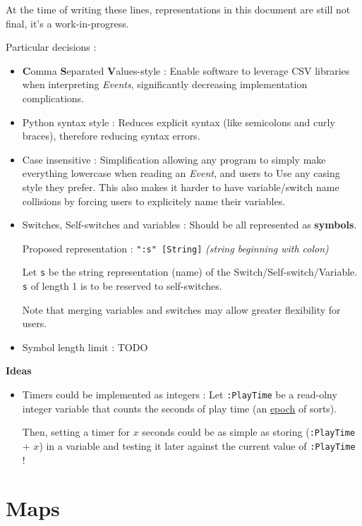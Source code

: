 \documentclass[11pt]{article}
\begin{document}
At the time of writing these lines, representations in this document are still not final, it's a work-in-progress.

Particular decisions :
\begin{itemize}
	\item \textbf{C}omma \textbf{S}eparated \textbf{V}alues-style : Enable software to leverage CSV libraries when interpreting \textit{Events}, significantly decreasing implementation complications.
	
	\item Python syntax style : Reduces explicit syntax (like semicolons and curly braces), therefore reducing syntax errors.
	
	\item Case insensitive : Simplification allowing any program to simply make everything lowercase when reading an \textit{Event}, and users to Use any casing style they prefer. This also makes it harder to have variable/switch name collisions by forcing users to explicitely name their variables.
	
	\item Switches, Self-switches and variables : Should be all represented as \textbf{symbols}. 
	
	Proposed representation : \verb|":s" [String]| \textit{(string beginning with colon)}
	
	Let \verb|s| be the string representation (name) of the Switch/Self-switch/Variable. \verb|s| of length 1 is to be reserved to self-switches.
	
	Note that merging variables and switches may allow greater flexibility for users.
	
	\item Symbol length limit : TODO
	
\end{itemize}


\textbf{Ideas}
\begin{itemize}
	\item Timers could be implemented as integers : Let \verb|:PlayTime| be a read-olny integer variable that counts the seconds of play time (an \href{https://en.wikipedia.org/wiki/Epoch_(computing)}{epoch} of sorts).
	
	Then, setting a timer for $x$ seconds could be as simple as storing (\verb|:PlayTime| + $x$) in a variable and testing it later against the current value of \verb|:PlayTime| !
\end{itemize}


\newpage
\section{Maps}
\end{document}
